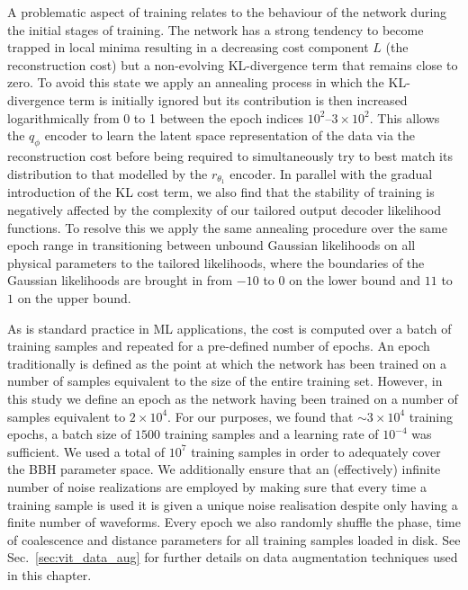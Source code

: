 %
%
A problematic aspect of training relates to the behaviour of the 
network during the initial stages of training. The network has a 
strong tendency to become trapped in local minima resulting in a 
decreasing cost component $L$ (the reconstruction cost) but a 
non-evolving \ac{KL}-divergence term that remains close to zero. To 
avoid this state we apply an annealing process in which the \ac{KL}-
divergence term is initially ignored but its contribution is then 
increased logarithmically from 0 to 1 between the epoch 
indices $10^2$--$3\times10^2$. This allows the $q_{\phi}$ encoder to 
learn the latent space representation of the data via the reconstruction 
cost before being required to simultaneously try to best match its 
distribution to that modelled by the $r_{\theta_1}$ encoder. In 
parallel with the gradual introduction of the \ac{KL} cost term, we 
also find that the stability of training is negatively affected by the
complexity of our tailored output decoder likelihood functions. To 
resolve this we apply the same annealing procedure over the same epoch 
range in transitioning between unbound Gaussian likelihoods on all 
physical parameters to the tailored likelihoods, where the boundaries 
of the Gaussian likelihoods are brought in from $-10$ to $0$ on the 
lower bound and $11$ to $1$ on the upper bound.

%
%
As is standard practice in \ac{ML} applications, the cost is 
computed over a batch of training samples and repeated for a 
pre-defined number of epochs. An epoch traditionally is 
defined as the point at which 
the network has been trained on a number of samples equivalent to the 
size of the entire training set. However, in this study we define an epoch 
as the network having been trained on a number of samples equivalent to 
$2\times10^4$. For our purposes, we found that $\sim 3 \times 10^4$ 
training epochs, a batch size of $1500$ training samples and a learning 
rate of $10^{-4}$ was sufficient. We used a total of $10^7$ training 
samples in order to adequately cover the \ac{BBH} parameter space. 
We additionally ensure that an (effectively) infinite number of 
noise realizations are employed by making
sure that every time a training sample is used it is given a unique 
noise realisation despite only having a finite number of 
waveforms. Every epoch we also randomly shuffle the phase, time of coalescence 
and distance parameters for all training samples loaded in disk. See
Sec.~\ref{sec:vit_data_aug} for further details on 
data augmentation techniques used in this chapter. 

